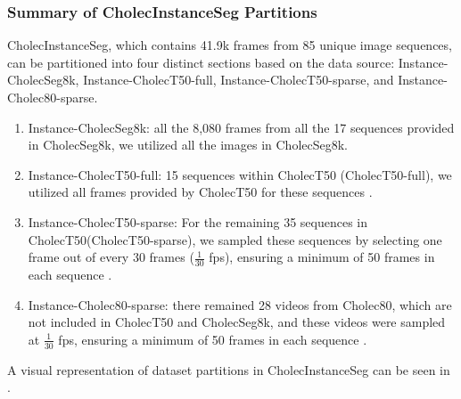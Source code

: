 \subsubsection{Summary of CholecInstanceSeg Partitions}
CholecInstanceSeg, which contains 41.9k frames from 85 unique image sequences, can be partitioned into four distinct sections based on the data source: Instance-CholecSeg8k, Instance-CholecT50-full, Instance-CholecT50-sparse, and Instance-Cholec80-sparse. 
%
%
\begin{enumerate}
    \item Instance-CholecSeg8k:  all the 8,080 frames from all the 17 sequences provided in CholecSeg8k, we utilized all the images in CholecSeg8k.
    \item Instance-CholecT50-full:   15 sequences within CholecT50 (CholecT50-full), we utilized all frames provided by CholecT50 for these  sequences .
    \item Instance-CholecT50-sparse: For the remaining 35 sequences in CholecT50(CholecT50-sparse), we sampled these sequences by selecting one frame out of every 30 frames ($\frac{1}{30}$ fps), ensuring a minimum of 50 frames in each sequence  . 
    \item Instance-Cholec80-sparse:  there remained 28 videos from Cholec80, which are not included in CholecT50 and CholecSeg8k, and these videos were sampled at $\frac{1}{30}$ fps, ensuring a minimum of 50 frames in each sequence  . 
\end{enumerate}
%
A visual representation of dataset partitions in CholecInstanceSeg can be seen in .



